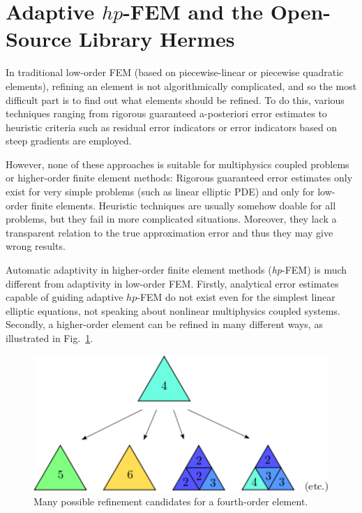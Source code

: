\section{Adaptive $hp$-FEM and the Open-Source Library Hermes}
\label{sec:hermes}

In traditional low-order FEM (based on piecewise-linear or piecewise quadratic elements), 
refining an element is not algorithmically complicated,
and so the most difficult part is to find out what elements should be refined. 
To do this, various techniques ranging from rigorous guaranteed a-posteriori 
error estimates to heuristic criteria such as residual error indicators or
error indicators based on steep gradients are employed. 

However, none of these approaches is suitable for
multiphysics coupled problems or higher-order finite element methods: 
Rigorous guaranteed error estimates only exist for very simple problems 
(such as linear elliptic PDE) and only for low-order finite elements.
Heuristic techniques are usually somehow doable for all problems, but 
they fail in more complicated situations. Moreover, they lack a 
transparent relation to the true approximation error and thus they may
give wrong results.

Automatic adaptivity in higher-order finite element methods (\emph{hp}-FEM) 
is much different from adaptivity in low-order FEM. Firstly, analytical
error estimates capable of guiding adaptive $hp$-FEM do not exist even for 
the simplest linear elliptic equations, not speaking about nonlinear multiphysics 
coupled systems. Secondly,
a higher-order element can be refined in many different ways, as illustrated 
in Fig.~\ref{fig:refinements}.
\begin{figure}[!ht]
  \begin{centering}
  \includegraphics[width=0.5\columnwidth]{refinements}
  \caption{\label{fig:refinements} Many possible refinement candidates for a fourth-order
  element.}
  \end{centering}
\end{figure}

